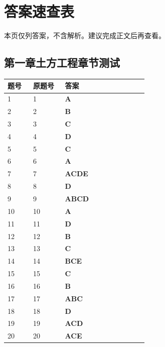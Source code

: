\documentclass[UTF8,fontset=windows,11pt]{ctexart}
\begin{document}
\newpage
\section*{答案速查表}
{\small\textcolor{examgray}{本页仅列答案，不含解析。建议完成正文后再查看。}}\par
\vspace{0.6em}
\subsection*{第一章土方工程章节测试}
\begin{longtable}{p{0.16\linewidth}p{0.2\linewidth}p{0.52\linewidth}}
\textbf{\textcolor{examnavy}{题号}} & \textbf{\textcolor{examnavy}{原题号}} & \textbf{\textcolor{answergreen}{答案}} \\
\hline
1 & 1 & \textbf{\textcolor{answergreen}{A}} \\
2 & 2 & \textbf{\textcolor{answergreen}{B}} \\
3 & 3 & \textbf{\textcolor{answergreen}{C}} \\
4 & 4 & \textbf{\textcolor{answergreen}{D}} \\
5 & 5 & \textbf{\textcolor{answergreen}{C}} \\
6 & 6 & \textbf{\textcolor{answergreen}{A}} \\
7 & 7 & \textbf{\textcolor{answergreen}{ACDE}} \\
8 & 8 & \textbf{\textcolor{answergreen}{D}} \\
9 & 9 & \textbf{\textcolor{answergreen}{ABCD}} \\
10 & 10 & \textbf{\textcolor{answergreen}{A}} \\
11 & 11 & \textbf{\textcolor{answergreen}{D}} \\
12 & 12 & \textbf{\textcolor{answergreen}{B}} \\
13 & 13 & \textbf{\textcolor{answergreen}{C}} \\
14 & 14 & \textbf{\textcolor{answergreen}{BCE}} \\
15 & 15 & \textbf{\textcolor{answergreen}{C}} \\
16 & 16 & \textbf{\textcolor{answergreen}{B}} \\
17 & 17 & \textbf{\textcolor{answergreen}{ABC}} \\
18 & 18 & \textbf{\textcolor{answergreen}{D}} \\
19 & 19 & \textbf{\textcolor{answergreen}{ACD}} \\
20 & 20 & \textbf{\textcolor{answergreen}{ACE}} \\

\end{longtable}
\end{document}
